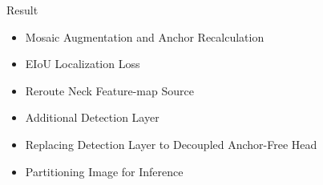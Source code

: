 \documentclass[final,hyperref={pdfpagelabels=false}]{beamer}
\begin{document}
\begin{frame}[t]
\begin{columns}[t]
\begin{column}{.465\textwidth}

\begin{block}{Result}
\begin{itemize}
  \item Mosaic Augmentation and Anchor Recalculation
    \begin{table}
    \small
    
    \end{table}
  \item EIoU Localization Loss
    \begin{table}
    \small
    
    \end{table}
  \item {Reroute Neck Feature-map Source}
    \begin{table}
    \small
    
    \end{table}
  \item {Additional Detection Layer}
    \begin{table}
    \small
    
    \end{table}
  \item {Replacing Detection Layer to Decoupled Anchor-Free Head}
    \begin{table}
    \small
    
    \end{table}
  \item {Partitioning Image for Inference}
    \begin{table}
    \small
    
    \end{table}
\end{itemize}


\end{block}
\end{column}
\end{columns}
\end{frame}
\end{document}
